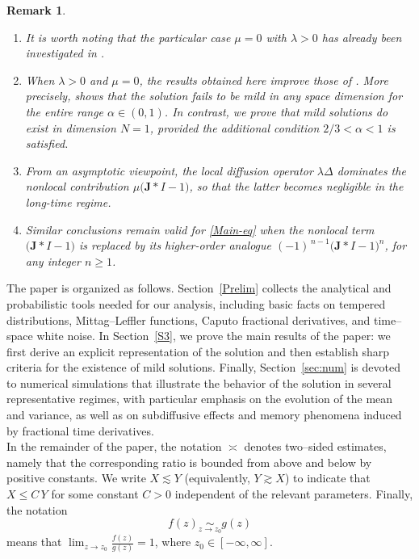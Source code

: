 \documentclass[12pt, reqno]{amsart}
\newtheorem{remark}{Remark}[section]
\begin{document}
\begin{remark}
\rm
~\begin{enumerate}[label=(\roman*)]
\item It is worth noting that the particular case $\mu=0$ with $\lambda>0$ has already been investigated in \cite{Hach}.

\item When $\lambda>0$ and $\mu=0$, the results obtained here improve those of \cite[Theorem~3, p.~525]{Hach}. More precisely, \cite[Theorem~3(c), p.~525]{Hach} shows that the solution fails to be mild in any space dimension for the entire range $\alpha\in(0,1)$. In contrast, we prove that mild solutions do exist in dimension $N=1$, provided the additional condition $2/3<\alpha<1$ is satisfied.

\item From an asymptotic viewpoint, the local diffusion operator $\lambda\Delta$ dominates the nonlocal contribution $\mu\big(\mathbf{J}\ast I-1\big)$, so that the latter becomes negligible in the long-time regime.

\item Similar conclusions remain valid for \eqref{Main-eq} when the nonlocal term $\big(\mathbf{J}\ast I-1\big)$ is replaced by its higher-order analogue $(-1)^{\,n-1}\big(\mathbf{J}\ast I-1\big)^{n}$, for any integer $n\ge1$.

\end{enumerate}
\end{remark}
The paper is organized as follows.
Section~\ref{Prelim} collects the analytical and probabilistic tools needed for our analysis, including basic facts on tempered distributions, Mittag--Leffler functions, Caputo fractional derivatives, and time--space white noise.
In Section~\ref{S3}, we prove the main results of the paper: we first derive an explicit representation of the solution and then establish sharp criteria for the existence of mild solutions.
Finally, Section~\ref{sec:num} is devoted to numerical simulations that illustrate the behavior of the solution in several representative regimes, with particular emphasis on the evolution of the mean and variance, as well as on subdiffusive effects and memory phenomena induced by fractional time derivatives.\\

In the remainder of the paper, the notation $\asymp$ denotes two--sided estimates, namely that the corresponding ratio is bounded from above and below by positive constants. We write $X\lesssim Y$ (equivalently, $Y\gtrsim X$) to indicate that $X\leq C\,Y$ for some constant $C>0$ independent of the relevant parameters. Finally, the notation
\[
f(z)\underset{z\to z_0}{\sim} g(z)
\]
means that $\displaystyle \lim_{z\to z_0}\frac{f(z)}{g(z)}=1$, where $z_0\in[-\infty,\infty]$.
\end{document}
